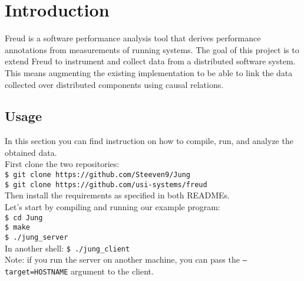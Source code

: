 \chapter{Introduction}

    Freud \cite{freud} is a software performance analysis tool that derives performance annotations
    from measurements of running systems. The goal of this project is to extend Freud to 
    instrument and collect data from a distributed software system. This means augmenting 
    the existing implementation to be able to link the data collected over distributed components 
    using causal relations.


    \section{Usage}

        In this section you can find instruction on how to compile, run, and analyze the obtained data.\\

        First clone the two repositories:\\
        
        \texttt{\$ git clone https://github.com/Steeven9/Jung}\\

        \texttt{\$ git clone https://github.com/usi-systems/freud}\\

        Then install the requirements as specified in both READMEs.\\

        Let's start by compiling and running our example program:\\

        \texttt{\$ cd Jung}\\

        \texttt{\$ make}\\

        \texttt{\$ ./jung\_server}\\
        
        In another shell: \texttt{\$ ./jung\_client}\\

        Note: if you run the server on another machine, you can pass the \texttt{---target=HOSTNAME}
        argument to the client.\\

